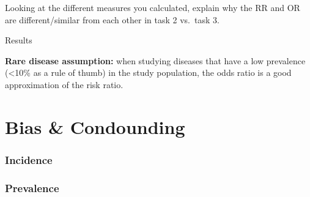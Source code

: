 \documentclass[
  14pt,
  letterpaper,
  DIV=11,
  numbers=noendperiod]{scrreprt}
\begin{document}
Looking at the different measures you calculated, explain why the RR and
OR are different/similar from each other in task 2 vs.~task 3.

Results

\textbf{Rare disease assumption:} when studying diseases that have a low
prevalence (\textless10\% as a rule of thumb) in the study population,
the odds ratio is a good approximation of the risk ratio.


\chapter{Bias \& Condounding}\label{sec-bias}

\subsection{Incidence}\label{incidence-1}

\subsection{Prevalence}\label{prevalence-1}
\end{document}
